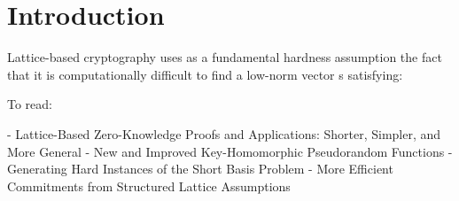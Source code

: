 \section{Introduction}%
\label{sec:introduction}

Lattice-based cryptography uses as a fundamental hardness assumption the fact that it is computationally difficult to find a low-norm vector s satisfying:

To read:

- Lattice-Based Zero-Knowledge Proofs and Applications: Shorter, Simpler, and More General
- New and Improved Key-Homomorphic Pseudorandom Functions
- Generating Hard Instances of the Short Basis Problem
- More Efficient Commitments from Structured Lattice Assumptions

